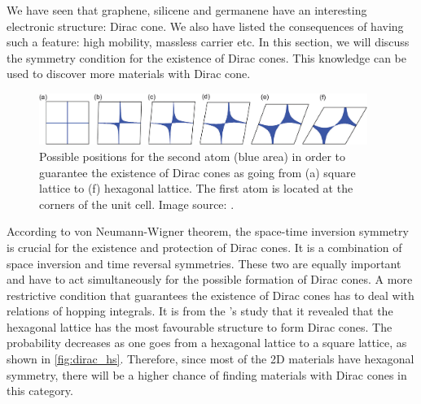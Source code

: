 We have seen that graphene, silicene and germanene have an interesting electronic structure: Dirac cone. We also have listed the consequences of having such a feature: high mobility, massless carrier etc. In this section, we will discuss the symmetry condition for the existence of Dirac cones. This knowledge can be used to discover more materials with Dirac cone. 
\begin{figure}[htbp!] 
\centering  
\includegraphics[width=0.95\textwidth]{dirac_hs.png}
\caption{Possible positions for the second atom (blue area) in order to guarantee the existence of Dirac cones as going from (a) square lattice to (f) hexagonal lattice. The first atom is located at the corners of the unit cell. Image source: \cite{Liu2013}. }  
\label{fig:dirac_hs}
\end{figure} 
According to von Neumann-Wigner theorem, the space-time inversion symmetry is crucial for the existence and protection of Dirac cones\cite{Wang2015b}. It is a combination of space inversion and time reversal symmetries. These two are equally important and have to act simultaneously for the possible formation of Dirac cones. A more restrictive condition that guarantees the existence of Dirac cones has to deal with relations of hopping integrals\cite{Hasegawa2006,Liu2013}. It is from the \citet{Liu2013}'s study that it revealed that the hexagonal lattice has the most favourable structure to form Dirac cones. The probability decreases as one goes from a hexagonal lattice to a square lattice, as shown in \autoref{fig:dirac_hs}. Therefore, since most of the 2D materials have hexagonal symmetry, there will be a higher chance of finding materials with Dirac cones in this category.


